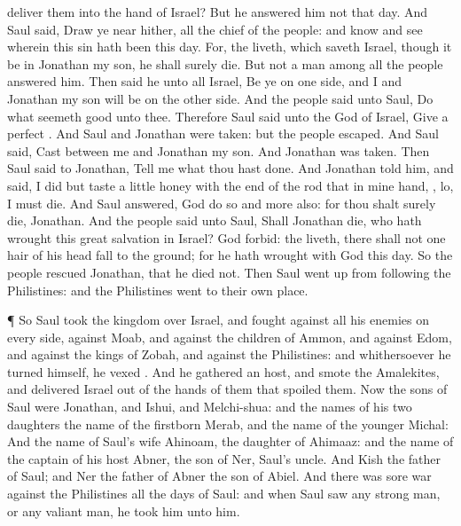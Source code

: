 {deliver them into the
hand of
Israel? But he
answered him not that
day.
And
Saul
said, Draw ye
near
hither, all the
chief of the
people: and
know and
see
wherein this
sin hath been this
day.
For,
{} the
{}
liveth, which
saveth
Israel, though it
be in
Jonathan my
son, he shall
surely
die. But
{} not a man among all the
people
{}
answered him.
Then
said he unto all
Israel, Be ye on
one
side, and I and
Jonathan my
son will be on the
other
side. And the
people
said unto
Saul,
Do what
seemeth
good unto thee.
Therefore
Saul
said unto the
{}
God of
Israel,
Give a
perfect
{}. And
Saul and
Jonathan were
taken: but the
people
escaped.
And
Saul
said,
Cast
{} between me and
Jonathan my
son. And
Jonathan was
taken.
Then
Saul
said to
Jonathan,
Tell me what thou hast
done. And
Jonathan
told him, and
said, I did
but
taste a
little
honey with the
end of the
rod that
{} in mine
hand,
{},
lo, I must
die.
And
Saul
answered,
God do
so and more
also: for thou shalt
surely
die,
Jonathan.
And the
people
said unto
Saul, Shall
Jonathan
die, who hath
wrought this
great
salvation in
Israel? God
forbid:
{} the
{}
liveth, there shall not one
hair of his
head
fall to the
ground; for he hath
wrought with
God this
day. So the
people
rescued
Jonathan, that he
died not.
Then
Saul went
up from
following the
Philistines: and the
Philistines
went to their own
place.
\par }{\PP {}¶ So
Saul
took the
kingdom over
Israel, and
fought against all his
enemies on every
side, against
Moab, and against the
children of
Ammon, and against
Edom, and against the
kings of
Zobah, and against the
Philistines: and whithersoever he
turned himself, he
vexed
{}.
And he
gathered an
host, and
smote the
Amalekites, and
delivered
Israel out of the
hands of them that
spoiled them.
Now the
sons of
Saul were
Jonathan, and
Ishui, and
Melchi-shua: and the
names of his
two
daughters
{} the
name of the
firstborn
Merab, and the
name of the
younger
Michal:
And the
name of
Saul’s
wife
{}
Ahinoam, the
daughter of
Ahimaaz: and the
name of the
captain of his
host
{}
Abner, the
son of
Ner,
Saul’s
uncle.
And
Kish
{} the
father of
Saul; and
Ner the
father of
Abner
{} the
son of
Abiel.
And there was
sore
war against the
Philistines all the
days of
Saul: and when
Saul
saw any
strong
man, or any
valiant
man, he
took him unto him.

}
